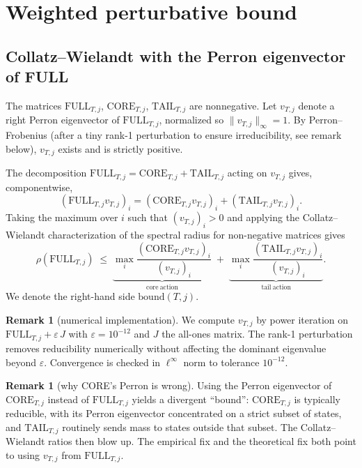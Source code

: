 \documentclass[11pt,a4paper]{article}
\theoremstyle{definition}
\newtheorem{remark}[theorem]{Remark}
\newcommand{\full}{\mathrm{FULL}}
\newcommand{\core}{\mathrm{CORE}}
\newcommand{\tail}{\mathrm{TAIL}}
\newcommand{\spec}{\rho}
\begin{document}
\section{Weighted perturbative bound}
\label{sec:bound}

\subsection{Collatz--Wielandt with the Perron eigenvector of FULL}

The matrices $\full_{T,j}$, $\core_{T,j}$, $\tail_{T,j}$ are
nonnegative. Let $v_{T,j}$ denote a right Perron eigenvector of
$\full_{T,j}$, normalized so $\|v_{T,j}\|_\infty = 1$. By
Perron--Frobenius (after a tiny rank-1 perturbation to ensure
irreducibility, see remark below), $v_{T,j}$ exists and is strictly
positive.

The decomposition $\full_{T,j} = \core_{T,j} + \tail_{T,j}$ acting
on $v_{T,j}$ gives, componentwise,
\[
(\full_{T,j} v_{T,j})_i
= (\core_{T,j} v_{T,j})_i + (\tail_{T,j} v_{T,j})_i.
\]
Taking the maximum over $i$ such that $(v_{T,j})_i > 0$ and
applying the Collatz--Wielandt characterization of the spectral
radius for non-negative matrices \cite{lemmensnussbaum,
akiangaubert} gives
\begin{equation}\label{eq:bound}
\boxed{\;
\spec(\full_{T,j})
\;\le\;
\underbrace{\max_i \frac{(\core_{T,j} v_{T,j})_i}{(v_{T,j})_i}}_{\mathrm{core\ action}}
\;+\;
\underbrace{\max_i \frac{(\tail_{T,j} v_{T,j})_i}{(v_{T,j})_i}}_{\mathrm{tail\ action}}.
\;}
\end{equation}
We denote the right-hand side $\mathrm{bound}(T,j)$.

\begin{remark}[numerical implementation]
We compute $v_{T,j}$ by power iteration on
$\full_{T,j} + \varepsilon\, J$ with $\varepsilon = 10^{-12}$ and
$J$ the all-ones matrix. The rank-1 perturbation removes
reducibility numerically without affecting the dominant eigenvalue
beyond $\varepsilon$. Convergence is checked in $\ell^\infty$ norm
to tolerance $10^{-12}$.
\end{remark}

\begin{remark}[why CORE's Perron is wrong]
Using the Perron eigenvector of $\core_{T,j}$ instead of
$\full_{T,j}$ yields a divergent ``bound'': $\core_{T,j}$ is
typically reducible, with its Perron eigenvector concentrated on a
strict subset of states, and $\tail_{T,j}$ routinely sends mass to
states outside that subset. The Collatz--Wielandt ratios then blow
up. The empirical fix and the theoretical fix both point to using
$v_{T,j}$ from $\full_{T,j}$.
\end{remark}
\end{document}
